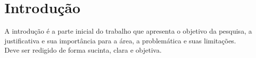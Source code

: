     \chapter{Introdução} %

A introdução é a parte inicial do trabalho que apresenta o objetivo da pesquisa, a justificativa e sua importância para a área, a problemática e suas limitações. Deve ser redigido de forma sucinta, clara e objetiva. 
